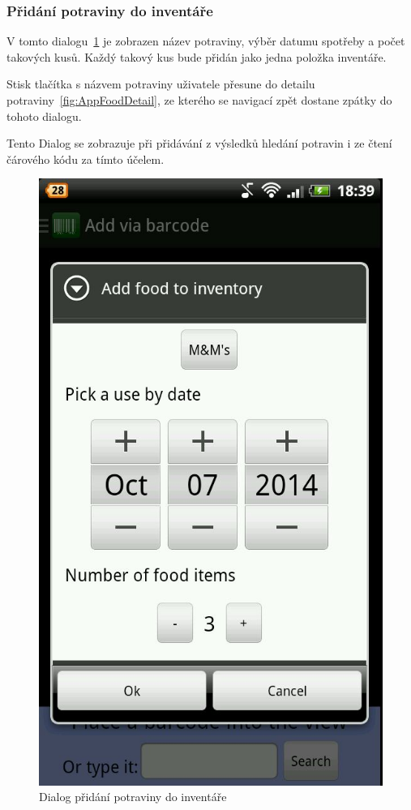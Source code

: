 \documentclass[thesis=B,czech]{FITthesis}[2013/10/20]
\begin{document}
\clearpage

\subsubsection{Přidání potraviny do inventáře}

V tomto dialogu~\ref{fig:AppScanAddFood} je zobrazen název potraviny, výběr datumu spotřeby a počet takových kusů. Každý takový kus bude přidán jako jedna položka inventáře.

Stisk tlačítka s názvem potraviny uživatele přesune do detailu potraviny~\ref{fig:AppFoodDetail}, ze kterého se navigací zpět dostane zpátky do tohoto dialogu.

Tento Dialog se zobrazuje při přidávání z výsledků hledání potravin i ze čtení čárového kódu za tímto účelem.

\begin{figure}[H]
  \centering
  \includegraphics[scale=0.4]{screenshots/app_scan_add_food.jpg}
  \caption{Dialog přidání potraviny do inventáře}
  \label{fig:AppScanAddFood}
\end{figure}
\end{document}
